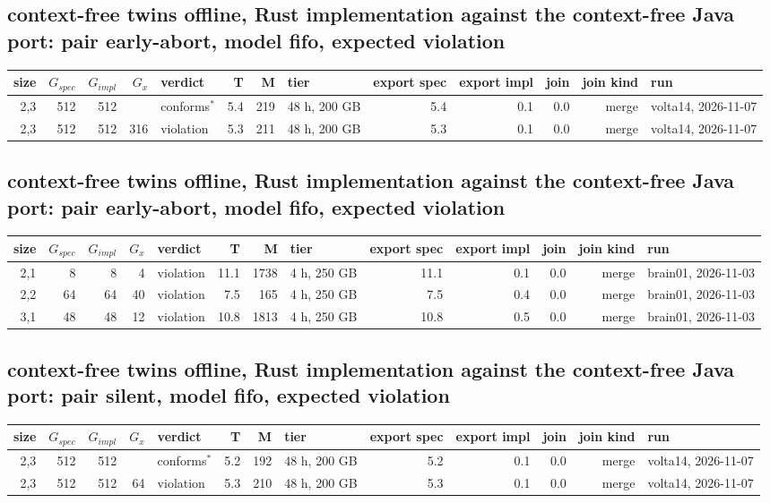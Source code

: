 \documentclass[10pt]{article}
\begin{document}
\subsection*{context-free twins offline, Rust implementation against the context-free Java port: pair \textsf{early-abort}, model fifo, expected violation}
\begin{longtable}{@{}rrrrlrrlrrrrl@{}}
\toprule
size & $G_{\mathit{spec}}$ & $G_{\mathit{impl}}$ & $G_x$ & verdict & T & M & tier & export spec & export impl & join & join kind & run \\
\midrule
\endhead
\color{red} 2,3 & 512 & 512 &  & conforms$^{\ast}$ & 5.4 & 219 & 48 h, 200 GB & 5.4 & 0.1 & 0.0 & merge & volta14, 2026-11-07 \\
\color{red} 2,3 & 512 & 512 & 316 & violation & 5.3 & 211 & 48 h, 200 GB & 5.3 & 0.1 & 0.0 & merge & volta14, 2026-11-07 \\
\bottomrule
\end{longtable}
\subsection*{context-free twins offline, Rust implementation against the context-free Java port: pair \textsf{early-abort}, model fifo, expected violation}
\begin{longtable}{@{}rrrrlrrlrrrrl@{}}
\toprule
size & $G_{\mathit{spec}}$ & $G_{\mathit{impl}}$ & $G_x$ & verdict & T & M & tier & export spec & export impl & join & join kind & run \\
\midrule
\endhead
\color{blue} 2,1 & 8 & 8 & 4 & violation & 11.1 & 1738 & 4 h, 250 GB & 11.1 & 0.1 & 0.0 & merge & brain01, 2026-11-03 \\
\color{blue} 2,2 & 64 & 64 & 40 & violation & 7.5 & 165 & 4 h, 250 GB & 7.5 & 0.4 & 0.0 & merge & brain01, 2026-11-03 \\
\color{blue} 3,1 & 48 & 48 & 12 & violation & 10.8 & 1813 & 4 h, 250 GB & 10.8 & 0.5 & 0.0 & merge & brain01, 2026-11-03 \\
\bottomrule
\end{longtable}
\subsection*{context-free twins offline, Rust implementation against the context-free Java port: pair \textsf{silent}, model fifo, expected violation}
\begin{longtable}{@{}rrrrlrrlrrrrl@{}}
\toprule
size & $G_{\mathit{spec}}$ & $G_{\mathit{impl}}$ & $G_x$ & verdict & T & M & tier & export spec & export impl & join & join kind & run \\
\midrule
\endhead
\color{red} 2,3 & 512 & 512 &  & conforms$^{\ast}$ & 5.2 & 192 & 48 h, 200 GB & 5.2 & 0.1 & 0.0 & merge & volta14, 2026-11-07 \\
\color{red} 2,3 & 512 & 512 & 64 & violation & 5.3 & 210 & 48 h, 200 GB & 5.3 & 0.1 & 0.0 & merge & volta14, 2026-11-07 \\
\bottomrule
\end{longtable}
\end{document}
